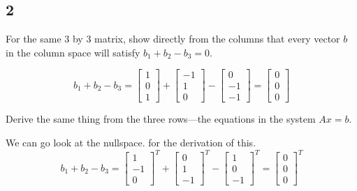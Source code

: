 \documentclass[12pt,letterpaper]{article}
\begin{document}
    \subsection*{2}
      For the same 3 by 3 matrix, show directly from the columns that every vector $b$ in the column space will satisfy $b_1 + b_2 - b_3 = 0$.

      \[
        b_1 + b_2 - b_3 =
        \begin{bmatrix}
          1 \\
          0 \\
          1
        \end{bmatrix}
        +
        \begin{bmatrix}
          -1 \\
          1 \\
          0
        \end{bmatrix}
        -
        \begin{bmatrix}
          0 \\
          -1 \\
          -1
        \end{bmatrix}
        =
        \begin{bmatrix}
          0 \\
          0 \\
          0
        \end{bmatrix}
      \]

      Derive the same thing from the three rows---the equations in the system $Ax = b$.

      We can go look at the nullspace. for the derivation of this.
      \[
        b_1 + b_2 - b_3
        =
        \begin{bmatrix}
          1 \\
          -1 \\
          0
        \end{bmatrix}^T
        +
        \begin{bmatrix}
          0 \\
          1 \\
          -1
        \end{bmatrix}^T
        -
        \begin{bmatrix}
          1 \\
          0 \\
          -1
        \end{bmatrix}^T
        =
        \begin{bmatrix}
          0 \\
          0 \\
          0
        \end{bmatrix}^T
      \]
\end{document}
